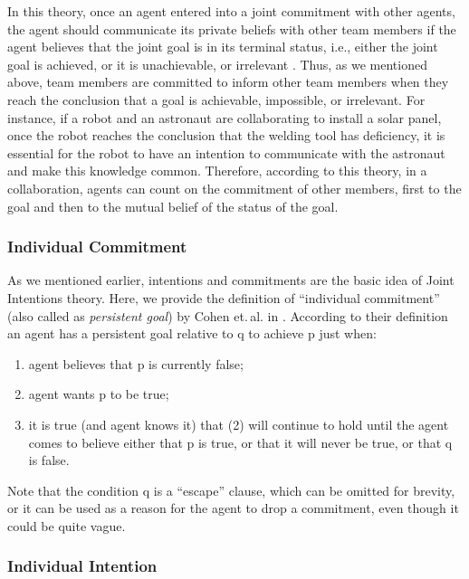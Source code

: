 \documentclass[11pt]{article}
\begin{document}
In this theory, once an agent entered into a joint commitment with other agents,
the agent should communicate its private beliefs with other team members if the
agent believes that the joint goal is in its terminal status, i.e., either the
joint goal is achieved, or it is unachievable, or irrelevant
\cite{wilsker:study-theories}. Thus, as we mentioned above, team members are
committed to inform other team members when they reach the conclusion that a
goal is achievable, impossible, or irrelevant. For instance, if a robot and an
astronaut are collaborating to install a solar panel, once the robot reaches the
conclusion that the welding tool has deficiency, it is essential for the robot
to have an intention to communicate with the astronaut and make this knowledge
common. Therefore, according to this theory, in a collaboration, agents can
count on the commitment of other members, first to the goal and then to the
mutual belief of the status of the goal.

\subsubsection{Individual Commitment}
\label{sec:individual-commitment}

As we mentioned earlier, intentions and commitments are the basic idea of Joint
Intentions theory. Here, we provide the definition of ``individual commitment''
(also called as \textit{persistent goal}) by Cohen et.\,al. in
\cite{cohen:team-formation}. According to their definition an agent has a
persistent goal relative to q to achieve p just when:

\begin{enumerate}
  \item agent believes that p is currently false;
  \item agent wants p to be true;
  \item it is true (and agent knows it) that (2) will continue to hold until the
  agent comes to believe either that p is true, or that it will never be true,
  or that q is false.
\end{enumerate}

Note that the condition q is a ``escape'' clause, which can be omitted for
brevity, or it can be used as a reason for the agent to drop a commitment, even
though it could be quite vague.

\subsubsection{Individual Intention}
\label{sec:individual-intention}
\end{document}
